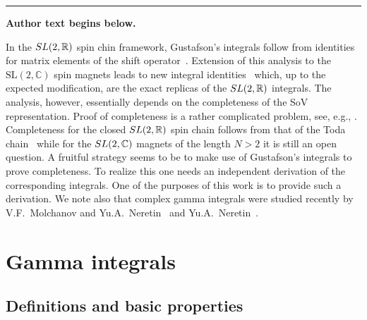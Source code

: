 \documentclass[11pt]{article}
\numberwithin{equation}{section}
\numberwithin{equation}{section}
\begin{document}
\medskip\hrule\medskip\noindent\textbf{Author text begins below.}\par
\setcounter{section}{1}
In the ${\rm SL}(2,\mathbb R)$ spin chin framework, Gustafson's integrals follow from identities for matrix elements
of the shift operator~\cite{Derkachov:2016dhc}.
 Extension of this analysis to the
$\mathrm{SL}(2,\mathbb{C})$ spin magnets leads to new integral identities~\cite{Derkachov:2016ucn,Derkachov:2017pvx}
which, up to the expected modification, are the exact replicas of the ${\rm SL}(2,\mathbb R)$ integrals. The analysis,
however, essentially depends on the completeness of the SoV representation. Proof of completeness is a rather
complicated problem, see, e.g., \cite{Derkachov:2018lyz,Kozlowski:2014jka,Schrader18}. Completeness for the closed
${\rm SL}(2,\mathbb R)$ spin chain follows from that of the Toda chain~\cite{Kozlowski:2014jka} while for the
${\rm SL}(2,\mathbb C)$ magnets of the length $N>2$ it is still an open question. A fruitful strategy seems to be to
make use of Gustafson's integrals to prove completeness. To realize this one needs an independent derivation of the
corresponding integrals. One of the purposes of this work is to provide such a derivation. We note also that complex
gamma integrals were studied recently by V.F.~Molchanov and Yu.A.~Neretin~\cite{Neretin} and
Yu.A.~Neretin~\cite{2018arXiv181207341N,Neretin:2019xze}.


\section{ Gamma integrals}\label{sect:two}

\subsection{Definitions and basic properties}\label{subsec:def}
\end{document}
